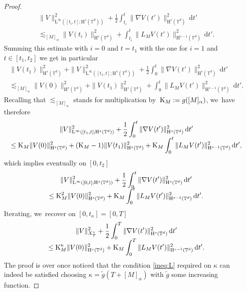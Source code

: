 \documentclass[10pt]{amsart}
\theoremstyle{definition}
\newcommand\T{\mathbb{T}}
\newcommand\dd{\mathrm{d}}
\renewcommand\H{\mathrm{H}}
\renewcommand\L{\mathrm{L}}
\begin{document}
\begin{proof}
\begin{multline*}
\|V\|_{\L^\infty([t_i,t];\H^s(\T^d))}^2 + \frac12 \int_{t_i}^{t} \|\nabla V(t')\|_{\H^s(\T^d)}^2\,\dd t'\\[
-5pt]
\lesssim_{[M]_\alpha} \|V(t_i)\|_{\H^s(\T^d)}^2 + \int_{t_i}^t\|L_{M }V(t')\|_{\H^{s-1}(\T^d)}^2\,\dd t'.
\end{multline*}
Summing this estimate with $i=0$ and $t=t_1$ with the one for $i=1$ and $t\in[t_1,t_2]$ we get in particular
\begin{multline*}
\|V(t_1)\|_{\H^s(\T^d)}^2 + \|V\|_{\L^\infty([t_1,t];\H^s(\T^d))}^2 + \frac12 \int_{0}^{t} \|\nabla V(t')\|_{\H^s(\T^d)}^2\,\dd t'\\\lesssim_{[M]_\alpha} \|V(0)\|_{\H^s(\T^d)}^2 + \|V(t_1)\|_{\H^s(\T^d)}^2 + \int_{0}^t\|L_{M }V(t')\|_{\H^{s-1}(\T^d)}^2\,\dd t'.
\end{multline*}
Recalling that $\lesssim_{[M]_\alpha}$ stands for multiplication by~$\textnormal{K}_M:=g([M]_\alpha)$, we~have therefore\vspace*{-5pt}
\begin{multline*}
\|V\|_{\L^\infty([t_1,t];\H^s(\T^d))}^2 + \frac12 \int_{0}^{t} \|\nabla V(t')\|_{\H^s(\T^d)}^2\,\dd t'\\[
-5pt]
\leq \textnormal{K}_{M}\|V(0)\|_{\H^s(\T^d)}^2 + (\textnormal{K}_{M}-1) \|V(t_1)\|_{\H^s(\T^d)}^2 + \textnormal{K}_{M} \int_{0}^t\|L_{M }V(t')\|_{\H^{s-1}(\T^d)}^2\,\dd t',
\end{multline*}
which implies eventually on $[0,t_2]$\vspace*{-5pt}
\begin{multline*}
\|V\|_{\L^\infty([0,t];\H^s(\T^d))}^2 + \frac12 \int_{0}^{t} \|\nabla V(t')\|_{\H^s(\T^d)}^2\,\dd t'\\[
-5pt]
\leq \textnormal{K}_{M}^2\|V(0)\|_{\H^s(\T^d)}^2 + \textnormal{K}_{M} \int_{0}^t\|L_{M }V(t')\|_{\H^{s-1}(\T^d)}^2\,\dd t'.
\end{multline*}
Iterating, we~recover on $[0,t_\kappa] = [0,T]$\vspace*{-5pt}
\begin{multline*}
\|V\|_{X_T^s}^2 + \frac12 \int_{0}^{T} \|\nabla V(t')\|_{\H^s(\T^d)}^2\,\dd t'\\[
-5pt]
\leq \textnormal{K}_{M}^\kappa\|V(0)\|_{\H^s(\T^d)}^2 + \textnormal{K}_{M} \int_{0}^T\|L_{M }V(t')\|_{\H^{s-1}(\T^d)}^2\,\dd t'.
\end{multline*}
The proof is over once noticed that the condition \eqref{ineq:L} required on $\kappa$ can indeed be satisfied choosing $\kappa=\widetilde g(T + [M]_\alpha)$ with $\widetilde g$ some increasing function.
\end{proof}
\end{document}
